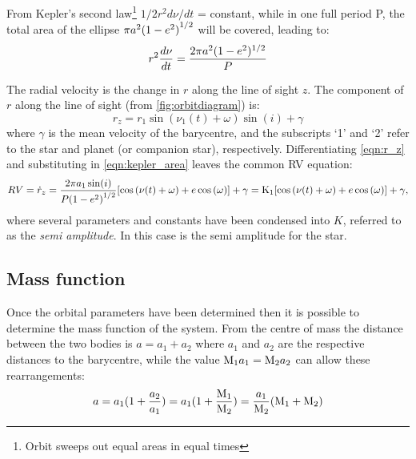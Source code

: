 From Kepler's second law\footnote{Orbit sweeps out equal areas in equal times} \(1/2 r^{2} d\nu/dt\) = constant, while in one full period P, the total area of the ellipse \(\pi a^{2}{(1 - {e}^{2})}^{1/2} \) will be covered, leading to: 
\begin{equation}
    r^2 \frac{d\nu}{dt} = \frac{2\pi a^{2}(1 - {e}^{2})^{1/2}}{P} \label{eqn:kepler_area}
\end{equation}

The radial velocity is the change in $r$ along the line of sight $z$.
The component of $r$ along the line of sight (from \cref{fig:orbitdiagram}) is:
\begin{equation}
    r_z =  r_1 \sin(\nu_1(t) + \omega)\sin(i) + \gamma \label{eqn:r_z}
\end{equation}
where $\gamma$ is the mean velocity of the barycentre, and the subscripts `1' and `2' refer to the star and planet (or companion star), respectively.
Differentiating \cref{eqn:r_z} and substituting in \cref{eqn:kepler_area} leaves the common RV equation:
\begin{equation}
    {RV} = \dot{r}_z= \frac{2 \pi a_1 \sin(i)}{P{(1 - {e}^{2})}^{1/2}} [\cos{(\nu(t) + \omega)} + e\cos{(\omega)}] + \gamma  \label{eqn:rv_equation} \\
     = \textrm{K}_{1} [\cos{(\nu(t) + \omega)} + e\cos{(\omega)}] + \gamma,
\end{equation}
where several parameters and constants have been condensed into $K$, referred to as the \emph{semi amplitude}.
In this case \Kone{} is the semi amplitude for the star.


\subsection{Mass function}
Once the orbital parameters have been determined then it is possible to determine the mass function of the system.
From the centre of mass the distance between the two bodies is \(a = a_1 + a_2\) where $a_1$ and $a_2$ are the respective distances to the barycentre, while the value \(\textrm{M}_{1} a_1 = \textrm{M}_{2} a_2\) can allow these rearrangements:
\begin{equation}
    a = a_{1} (1 + \frac{a_{2}}{a_{1}}) = a_{1}(1 + \frac{\textrm{M}_{1}}{\textrm{M}_{2}}) = \frac{a_{1}}{\textrm{M}_{2}} (\textrm{M}_{1} + \textrm{M}_{2})
\end{equation}

